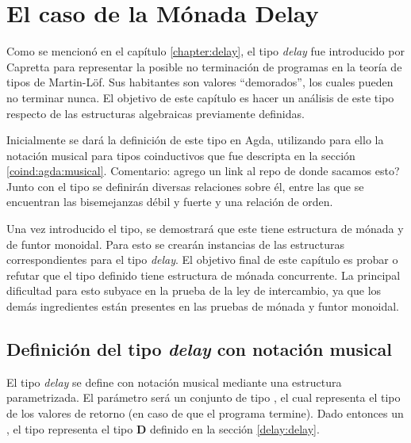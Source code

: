 \chapter{El caso de la Mónada Delay}\label{chapter:casodelay}

Como se mencionó en el capítulo \ref{chapter:delay}, el tipo \textit{delay} fue introducido por Capretta \cite{capretta:2005} para representar la posible no terminación de programas en la teoría de tipos de Martin-Löf. Sus habitantes son valores ``demorados'', los cuales pueden no terminar nunca. El objetivo de este capítulo es hacer un análisis de este tipo respecto de las estructuras algebraicas previamente definidas. 

Inicialmente se dará la definición de este tipo en Agda, utilizando para ello la notación musical para tipos coinductivos que fue descripta en la sección \ref{coind:agda:musical}. {\color{red} Comentario: agrego un link al repo de donde sacamos esto?} Junto con el tipo se definirán diversas relaciones sobre él, entre las que se encuentran las bisemejanzas débil y fuerte y una relación de orden. 

Una vez introducido el tipo, se demostrará que este tiene estructura de mónada y de funtor monoidal. Para esto se crearán instancias de las estructuras correspondientes para el tipo \textit{delay}. El objetivo final de este capítulo es probar o refutar que el tipo definido tiene estructura de mónada concurrente. La principal dificultad para esto subyace en la prueba de la ley de intercambio, ya que los demás ingredientes están presentes en las pruebas de mónada y funtor monoidal. 

\section{Definición del tipo \textit{delay} con notación musical}\label{casodelay:defmus}

El tipo \textit{delay} se define con notación musical mediante una estructura  parametrizada. El parámetro será un conjunto  de tipo , el cual representa el tipo de los valores de retorno (en caso de que el programa termine). Dado entonces un  \AgdaSymbol{:} , el tipo  \AgdaDatatype{$\bot$} representa el tipo $\mathbf{D}$ definido en la sección \ref{delay:delay}. 


